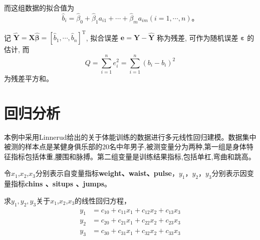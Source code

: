 \documentclass[a4paper,12pt]{article}
\begin{document}
而这组数据的拟合值为
$$
\hat{b}_{i}=\hat{\beta}_{0}+\hat{\beta}_{1} a_{i 1}+\cdots+\hat{\beta}_{m} a_{i m}(i=1, \cdots, n) 。
$$

记 $\hat{\boldsymbol{Y}}=\boldsymbol{X} \hat{\boldsymbol{\beta}}=\left[\hat{b}_{1}, \cdots, \hat{b}_{n}\right]^{\mathrm{T}}$, 拟合误差 $\boldsymbol{e}=\boldsymbol{Y}-\hat{\boldsymbol{Y}}$ 称为残差, 可作为随机误差 $\boldsymbol{\varepsilon}$ 的估计, 而
$$
Q=\sum_{i=1}^{n} e_{i}^{2}=\sum_{i=1}^{n}\left(b_{i}-b_{i}\right)^{2}
$$
为残差平方和。

\section{回归分析}
本例中采用Linnerud给出的关于体能训练的数据进行多元线性回归建模。数据集中被测的样本点是某健身俱乐部的20名中年男子,被测变量分为两种,第一组是身体特征指标包括体重,腰围和脉搏。第二组变量是训练结果指标,包括单杠,弯曲和跳高。

令$x_1$,$x_2$,$x_3$分别表示自变量指标\textbf{weight、waist、pulse}，$y_1$，$y_2$，$y_3$分别表示因变量指标\textbf{chins 、situps 、jumps}。

求$y_1,y_2,y_3$关于$x_1$,$x_2$,$x_3$的线性回归方程，
\begin{align*}
y_1 &= c_{10} + c_{11}x_1 + c_{12}x_2 +c_{13}x_3\\
y_2 &= c_{20} + c_{21}x_1 + c_{22}x_2 +c_{23}x_3\\
y_3 &= c_{30} + c_{31}x_1 + c_{32}x_2 +c_{33}x_3
\end{align*}
\end{document}
